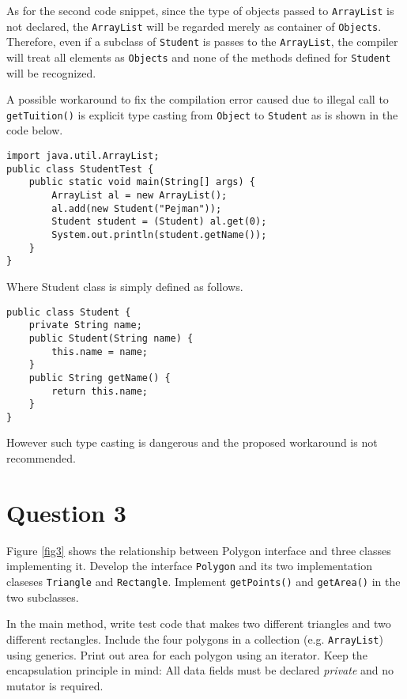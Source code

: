 As for the second code snippet, since the type of objects passed to \texttt{ArrayList} is not declared, the \texttt{ArrayList} will be regarded merely as container of \texttt{Objects}.
Therefore, even if a subclass of \texttt{Student} is passes to the \texttt{ArrayList}, the compiler will treat all elements as \texttt{Objects} and none of the methods defined for \texttt{Student} will be recognized.

A possible workaround to fix the compilation error caused due to illegal call to \texttt{getTuition()} is explicit type casting from \texttt{Object} to \texttt{Student} as is shown in the code below.

\begin{lstlisting}
import java.util.ArrayList;
public class StudentTest {
	public static void main(String[] args) {
		ArrayList al = new ArrayList();
		al.add(new Student("Pejman"));
		Student student = (Student) al.get(0);
		System.out.println(student.getName());
	}
}
\end{lstlisting}

Where Student class is simply defined as follows.

\begin{lstlisting}
public class Student {
	private String name;
	public Student(String name) {
		this.name = name;
	}
	public String getName() {
		return this.name;
	}
}
\end{lstlisting}

However such type casting is dangerous and the proposed workaround is not recommended.

\section{Question 3}

Figure \ref{fig3} shows the relationship between Polygon interface and three classes implementing it.
Develop the interface \texttt{Polygon} and its two implementation claseses \texttt{Triangle} and \texttt{Rectangle}.
Implement \texttt{getPoints()} and \texttt{getArea()} in the two subclasses.

In the main method, write test code that makes two different triangles and two different rectangles.
Include the four polygons in a collection (e.g. \texttt{ArrayList}) using generics.
Print out area for each polygon using an iterator.
Keep the encapsulation principle in mind: All data fields must be declared \textit{private} and no mutator is required.

